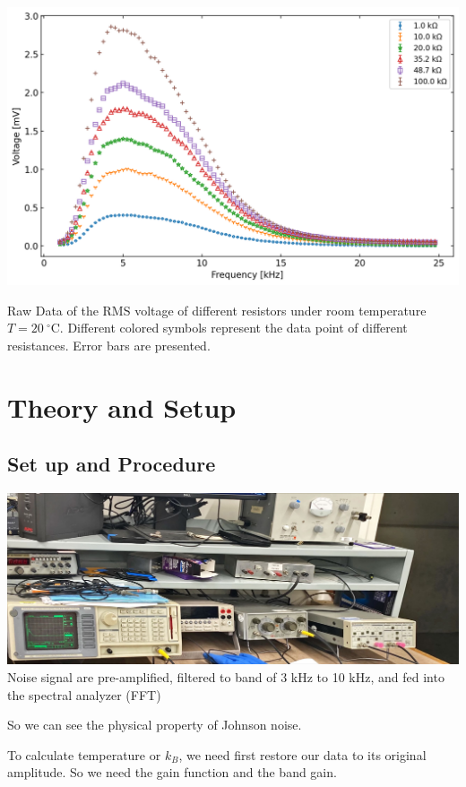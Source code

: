 \documentclass[a4paper]{tufte-handout}
\begin{document}
\begin{center}
\includegraphics[width = 1\textwidth]{figures/day4_vres.png}
    \caption{Raw Data of the RMS voltage of different resistors under room temperature $T=20~^\circ$C. Different colored symbols represent the data point of different resistances. Error bars are presented.}
    \label{fig:raw data room temperature}
\end{center}



\newpage
\section{Theory and Setup}

\subsection{Set up and Procedure}

\includegraphics[width= 1 \linewidth]{figures/day1_setup.jpg}
Noise signal are pre-amplified, filtered to band of 3 kHz to 10 kHz, and fed into the spectral analyzer (FFT)

So we can see the physical property of Johnson noise. 

To calculate temperature or $k_B$, we need first restore our data to its original amplitude. So we need the gain function and the band gain.
\end{document}
